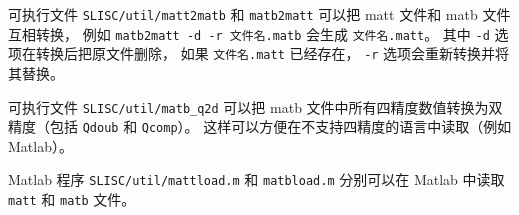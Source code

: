 可执行文件 \verb`SLISC/util/matt2matb` 和 \verb`matb2matt` 可以把 matt 文件和 matb 文件互相转换， 例如 \verb`matb2matt -d -r 文件名.matb` 会生成 \verb`文件名.matt`。 其中 \verb`-d` 选项在转换后把原文件删除， 如果 \verb`文件名.matt` 已经存在， \verb`-r` 选项会重新转换并将其替换。

可执行文件 \verb`SLISC/util/matb_q2d` 可以把 matb 文件中所有四精度数值转换为双精度（包括 \verb`Qdoub` 和 \verb`Qcomp`）。 这样可以方便在不支持四精度的语言中读取（例如 Matlab）。

Matlab 程序 \verb`SLISC/util/mattload.m` 和 \verb`matbload.m` 分别可以在 Matlab 中读取 \verb`matt` 和 \verb`matb` 文件。

